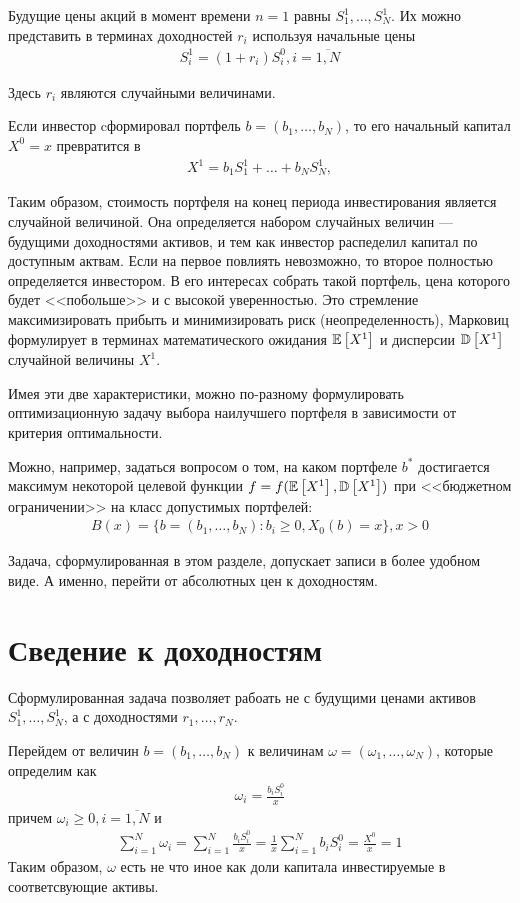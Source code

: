 Будущие цены акций в момент времени $n=1$ равны $S_1^1, \dots, S_N^1$. 
Их можно представить в терминах доходностей $r_i$ используя начальные цены
\begin{align}
	S_i^1 = (1 + r_i) S_i^0, i=\overline{1, N}
\end{align}

Здесь $r_i$ являются случайными величинами.


Если инвестор cформировал портфель $b = (b_1, \dots, b_N )$, то его начальный капитал $X^0 = x$ превратится в 
\begin{align}
	X^1 = b_1 S_1^1 + \dots + b_N S_N^1,
\end{align}

Таким образом, стоимость портфеля на конец периода инвестирования является случайной величиной. 
Она определяется набором случайных величин --- будущими доходностями активов, и тем как инвестор распеделил капитал
по доступным актвам. Если на первое повлиять невозможно, то второе полностью определяется инвестором.
В его интересах собрать такой портфель, цена которого будет <<побольше>> и с высокой уверенностью.
Это стремление максимизировать прибыть и минимизировать риск (неопределенность), Марковиц формулирует в терминах
математического ожидания $\mathbb{E}\left[X^1\right]$ и дисперсии $\mathbb{D}\left[X^1\right]$ случайной величины $X^1$.

Имея эти две характеристики, можно по-разному формулировать оптимизационную задачу выбора наилучшего портфеля в
зависимости от критерия оптимальности.

Можно, например, задаться вопросом о том, на каком портфеле $b^*$ достигается максимум некоторой целевой функции 
$f = f(\mathbb{E}\left[X^1\right], \mathbb{D}\left[X^1\right])$ при <<бюджетном ограничении>> на класс допустимых портфелей:
\begin{align}
	B(x) = \{b=(b_1, \dots, b_N): b_i \ge 0, X_0(b) = x\}, x > 0
\end{align}

Задача, сформулированная в этом разделе, допускает записи в более удобном виде. А именно, перейти от абсолютных цен
к доходностям.

\section{Сведение к доходностям}

Сформулированная задача позволяет рабоать не с будущими ценами активов $S_1^1, \dots, S_N^1$,
а с доходностями $r_1, \dots, r_N$.

Перейдем от величин $b = (b_1, \dots, b_N)$ к величинам $\omega = (\omega_1, \dots, \omega_N)$, которые определим как
\begin{align}
	\omega_i = \frac{b_i S_i^0}{x}
\end{align}
причем $\omega_i \ge 0, i=\overline{1, N}$ и
\begin{align}
	\sum_{i=1}^{N} \omega_i 
	= \sum_{i=1}^{N} \frac{b_i S_i^0}{x}
	= \frac{1}{x} \sum_{i=1}^{N} b_i S_i^0
	= \frac{X^0}{x} = 1
\end{align}
Таким образом, $\omega$ есть не что иное как доли капитала инвестируемые в соответсвующие активы.

